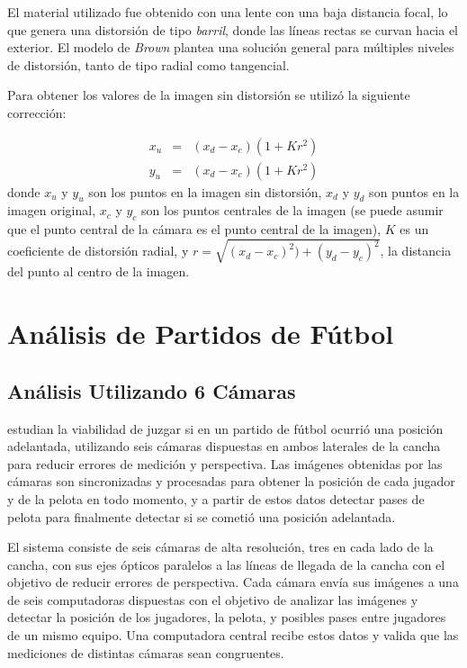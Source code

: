 El material utilizado fue obtenido con una lente con una baja distancia focal,
lo que genera una distorsión de tipo \textit{barril}, donde las líneas rectas
se curvan hacia el exterior. El modelo de \textit{Brown} plantea una solución
general para múltiples niveles de distorsión, tanto de tipo radial como
tangencial.

Para obtener los valores de la imagen sin distorsión se utilizó la siguiente
corrección:

\begin{eqnarray*}
    x_u &=& (x_d - x_c) (1+K r^2) \\
    y_u &=& (x_d - x_c) (1+K r^2)
\end{eqnarray*}
donde $x_u$ y $y_u$ son los puntos en la imagen sin distorsión, $x_d$ y $y_d$ son
puntos en la imagen original, $x_c$ y $y_c$ son los puntos centrales de la
imagen (se puede asumir que el punto central de la cámara es el punto central
de la imagen), $K$ es un coeficiente de distorsión radial, y $r =
\sqrt{(x_d-x_c)^2) + (y_d-y_c)^2}$, la distancia del punto al centro de la
imagen.


\section{Análisis de Partidos de Fútbol}
\label{sec:futbol}

\subsection{Análisis Utilizando 6 Cámaras}
\label{sec:6-camaras}

\citeauthor*{papers-tanos} estudian la viabilidad de juzgar si en un partido de fútbol
ocurrió una posición adelantada, utilizando seis cámaras dispuestas en ambos
laterales de la cancha para reducir errores de medición y perspectiva. Las
imágenes obtenidas por las cámaras son sincronizadas y procesadas para obtener
la posición de cada jugador y de la pelota en todo momento, y a partir de estos
datos detectar pases de pelota para finalmente detectar si se cometió una
posición adelantada.

El sistema consiste de seis cámaras de alta resolución, tres en cada lado de
la cancha, con sus ejes ópticos paralelos a las líneas de llegada de la cancha
con el objetivo de reducir errores de perspectiva. Cada cámara envía sus
imágenes a una de seis computadoras dispuestas con el objetivo de analizar las
imágenes y detectar la posición de los jugadores, la pelota, y posibles pases
entre jugadores de un mismo equipo. Una computadora central recibe estos datos y
valida que las mediciones de distintas cámaras sean congruentes.

